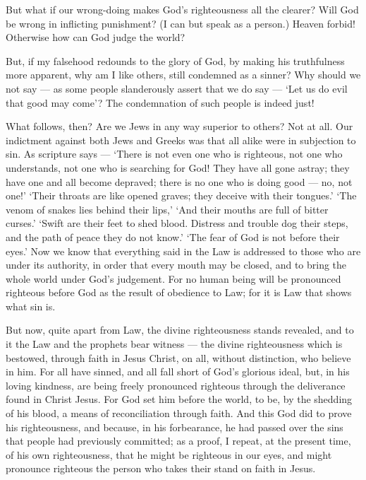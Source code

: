  But what if our wrong-doing makes God's righteousness all
the clearer? Will God be wrong in inflicting punishment? (I can but
speak as a person.) Heaven forbid!  Otherwise how can God
judge the world?

 But, if my falsehood redounds to the glory of God, by
making his truthfulness more apparent, why am I like others, still
condemned as a sinner?  Why should we not say --- as some
people slanderously assert that we do say --- `Let us do evil that good
may come'? The condemnation of such people is indeed just!

 What follows, then? Are we Jews in any way superior to
others? Not at all. Our indictment against both Jews and Greeks was that
all alike were in subjection to sin.  As scripture says ---
`There is not even one who is righteous,  not one who
understands, not one who is searching for God!  They have
all gone astray; they have one and all become depraved; there is no one
who is doing good --- no, not one!'  `Their throats are
like opened graves; they deceive with their tongues.' `The venom of
snakes lies behind their lips,'  `And their mouths are full
of bitter curses.'  `Swift are their feet to shed blood.
 Distress and trouble dog their steps,  and
the path of peace they do not know.'  `The fear of God is
not before their eyes.'  Now we know that everything said
in the Law is addressed to those who are under its authority, in order
that every mouth may be closed, and to bring the whole world under God's
judgement.  For no human being will be pronounced righteous
before God as the result of obedience to Law; for it is Law that shows
what sin is.

 But now, quite apart from Law, the divine righteousness
stands revealed, and to it the Law and the prophets bear witness ---
 the divine righteousness which is bestowed, through faith
in Jesus Christ, on all, without distinction, who believe in him.
 For all have sinned, and all fall short of God's glorious
ideal,  but, in his loving kindness, are being freely
pronounced righteous through the deliverance found in Christ Jesus.
 For God set him before the world, to be, by the shedding
of his blood, a means of reconciliation through faith. And this God did
to prove his righteousness, and because, in his forbearance, he had
passed over the sins that people had previously committed; 
as a proof, I repeat, at the present time, of his own righteousness,
that he might be righteous in our eyes, and might pronounce righteous
the person who takes their stand on faith in Jesus.

